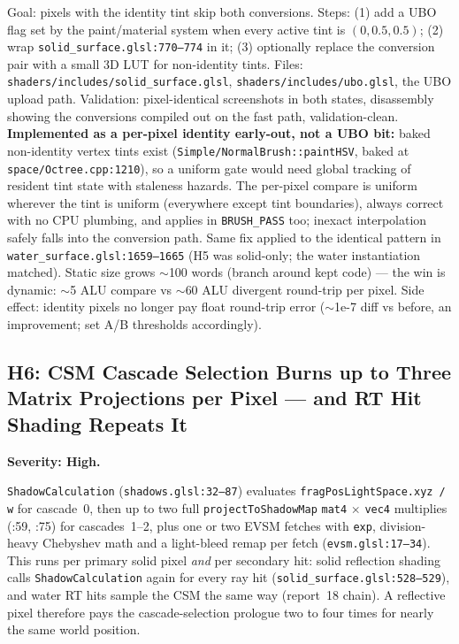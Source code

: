 \documentclass[11pt,a4paper]{article}
\begin{document}
\begin{tcolorbox}[promptbox={Prompt --- H5: gate the per-pixel HSV round-trip}]
Goal: pixels with the identity tint skip both conversions. Steps: (1) add a
UBO flag set by the paint/material system when every active tint is
$(0, 0.5, 0.5)$; (2) wrap \texttt{solid\_surface.glsl:770--774} in it;
(3) optionally replace the conversion pair with a small 3D LUT for
non-identity tints. Files: \texttt{shaders/includes/solid\_surface.glsl},
\texttt{shaders/includes/ubo.glsl}, the UBO upload path. Validation:
pixel-identical screenshots in both states, disassembly showing the
conversions compiled out on the fast path, validation-clean.
\\ \textbf{Implemented as a per-pixel identity early-out, not a UBO bit:}
baked non-identity vertex tints exist (\texttt{Simple/NormalBrush::paintHSV},
baked at \texttt{space/Octree.cpp:1210}), so a uniform gate would need global
tracking of resident tint state with staleness hazards. The per-pixel compare
is uniform wherever the tint is uniform (everywhere except tint boundaries),
always correct with no CPU plumbing, and applies in \texttt{BRUSH\_PASS} too;
inexact interpolation safely falls into the conversion path. Same fix applied
to the identical pattern in \texttt{water\_surface.glsl:1659--1665} (H5 was
solid-only; the water instantiation matched). Static size grows $\sim$100
words (branch around kept code) --- the win is dynamic: $\sim$5 ALU compare
vs $\sim$60 ALU divergent round-trip per pixel. Side effect: identity pixels
no longer pay float round-trip error ($\sim$1e-7 diff vs before, an
improvement; set A/B thresholds accordingly).
\end{tcolorbox}

\subsection{H6: CSM Cascade Selection Burns up to Three Matrix Projections per Pixel --- and RT Hit Shading Repeats It}
\label{sec:h6}

\textbf{Severity: High.}

\texttt{ShadowCalculation} (\texttt{shadows.glsl:32--87}) evaluates
\texttt{fragPosLightSpace.xyz / w} for cascade~0, then up to two full
\texttt{projectToShadowMap} \texttt{mat4} $\times$ \texttt{vec4} multiplies
(:59, :75) for cascades~1--2, plus one or two EVSM fetches with \texttt{exp},
division-heavy Chebyshev math and a light-bleed remap per fetch
(\texttt{evsm.glsl:17--34}). This runs per primary solid pixel \emph{and} per
secondary hit: solid reflection shading calls \texttt{ShadowCalculation} again
for every ray hit (\texttt{solid\_surface.glsl:528--529}), and water RT hits
sample the CSM the same way (report~18 chain). A reflective pixel therefore
pays the cascade-selection prologue two to four times for nearly the same
world position.
\end{document}

